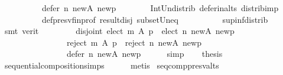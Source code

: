 \begin{isabellebody}
\ \ \ \ \ \ \ \ \ \ {\isacharparenleft}{\kern0pt}defer\ n\ {\isacharquery}{\kern0pt}new{\isacharunderscore}{\kern0pt}A\ {\isacharquery}{\kern0pt}new{\isacharunderscore}{\kern0pt}p{\isacharparenright}{\kern0pt}\ {\isacharequal}{\kern0pt}\ {\isacharbraceleft}{\kern0pt}{\isacharbraceright}{\kern0pt}{\isachardoublequoteclose}\isanewline
\ \ \ \ \isamarkupfalse%
\ Int{\isacharunderscore}{\kern0pt}Un{\isacharunderscore}{\kern0pt}distrib{}\ defer{\isacharunderscore}{\kern0pt}in{\isacharunderscore}{\kern0pt}alts\ distrib{\isacharunderscore}{\kern0pt}imp{}\isanewline
\ \ \ \ \ \ \ \ \ \ def{\isacharunderscore}{\kern0pt}presv{\isacharunderscore}{\kern0pt}fin{\isacharunderscore}{\kern0pt}prof\ result{\isacharunderscore}{\kern0pt}disj\ subset{\isacharunderscore}{\kern0pt}Un{\isacharunderscore}{\kern0pt}eq\isanewline
\ \ \ \ \ \ \ \ \ \ sup{\isacharunderscore}{\kern0pt}inf{\isacharunderscore}{\kern0pt}distrib{}\isanewline
\ \ \ \ \isamarkupfalse%
\ {\isacharparenleft}{\kern0pt}smt\ {\isacharparenleft}{\kern0pt}verit{\isacharparenright}{\kern0pt}{\isacharparenright}{\kern0pt}\isanewline
\ \ \isamarkupfalse%
\ \isamarkupfalse%
\isanewline
\ \ \ \ {\isachardoublequoteopen}disjoint{}\ {\isacharparenleft}{\kern0pt}elect\ m\ A\ p\ {\isasymunion}\ elect\ n\ {\isacharquery}{\kern0pt}new{\isacharunderscore}{\kern0pt}A\ {\isacharquery}{\kern0pt}new{\isacharunderscore}{\kern0pt}p{\isacharcomma}{\kern0pt}\isanewline
\ \ \ \ \ \ \ \ \ \ \ \ \ \ \ \ reject\ m\ A\ p\ {\isasymunion}\ reject\ n\ {\isacharquery}{\kern0pt}new{\isacharunderscore}{\kern0pt}A\ {\isacharquery}{\kern0pt}new{\isacharunderscore}{\kern0pt}p{\isacharcomma}{\kern0pt}\isanewline
\ \ \ \ \ \ \ \ \ \ \ \ \ \ \ \ defer\ n\ {\isacharquery}{\kern0pt}new{\isacharunderscore}{\kern0pt}A\ {\isacharquery}{\kern0pt}new{\isacharunderscore}{\kern0pt}p{\isacharparenright}{\kern0pt}{\isachardoublequoteclose}\isanewline
\ \ \ \ \isamarkupfalse%
\ simp\isanewline
\ \ \isamarkupfalse%
\ {\isacharquery}{\kern0pt}thesis\isanewline
\ \ \ \ \isamarkupfalse%
\ sequential{\isacharunderscore}{\kern0pt}composition{\isachardot}{\kern0pt}simps\isanewline
\ \ \ \ \isamarkupfalse%
\ metis\isanewline
{}\isamarkupfalse%
%
\endisatagproof
{\isafoldproof}%
%
\isadelimproof
\isanewline
%
\endisadelimproof
\isanewline
{}\isamarkupfalse%
\ seq{\isacharunderscore}{\kern0pt}comp{\isacharunderscore}{\kern0pt}presv{\isacharunderscore}{\kern0pt}alts{\isacharcolon}{\kern0pt}\isanewline

\end{isabellebody}
